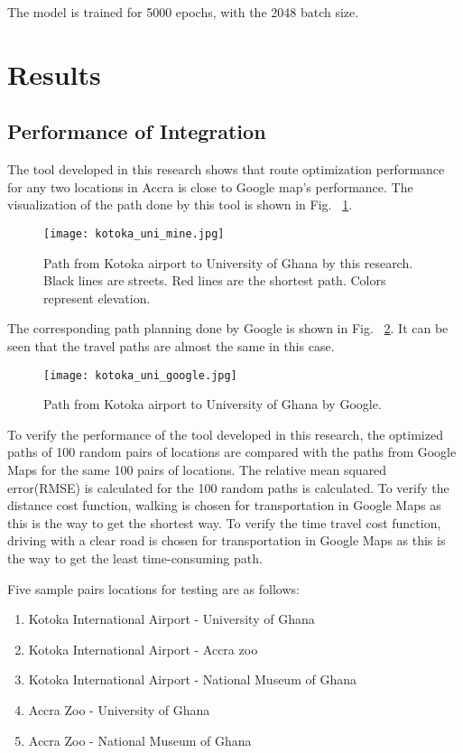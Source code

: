 \documentclass[final-report]{report-template}
\begin{document}
The model is trained for 5000 epochs, with the 2048 batch size.


\section {Results}
\subsection{Performance of Integration}
The tool developed in this research shows that route optimization performance for any two locations in Accra
is close to Google map's performance.
The visualization of the path done by this tool is shown in Fig. ~\ref{fig: mine}.

\begin{figure}[H]
    \centering
    \texttt{[image: kotoka\_uni\_mine.jpg]}
    \caption{\label{fig: mine} Path from Kotoka airport to University of Ghana by this research. Black lines are streets. Red lines are the shortest path. Colors represent elevation.}
\end{figure}
The corresponding path planning done by Google is shown in Fig. ~\ref{fig: google}. 
It can be seen that the travel paths are almost the same in this case.
\begin{figure}[H]
    \centering
    \texttt{[image: kotoka\_uni\_google.jpg]}
    \caption{\label{fig: google} Path from Kotoka airport to University of Ghana by Google.}
\end{figure}

To verify the performance of the tool developed in this research, 
the optimized paths of 100 random pairs of locations are compared with the paths from Google Maps for the same 100 pairs of locations.
The relative mean squared error(RMSE) is calculated for the 100 random paths is calculated.
To verify the distance cost function, walking is chosen for transportation in Google Maps as this is the way to get the shortest way.
To verify the time travel cost function, driving with a clear road is chosen for transportation in Google Maps as this is the way to get the least time-consuming path.

Five sample pairs locations for testing are as follows:
\begin{enumerate}
    \item Kotoka International Airport - University of Ghana
    \item Kotoka International Airport - Accra zoo
    \item Kotoka International Airport - National Museum of Ghana
    \item Accra Zoo - University of Ghana
    \item Accra Zoo - National Museum of Ghana
\end{enumerate}
\end{document}
